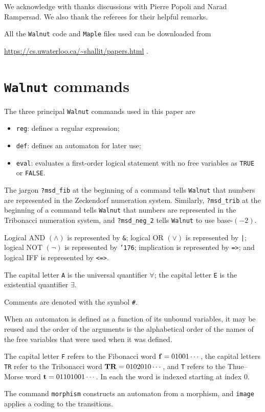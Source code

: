 \documentclass[final]{dmtcs-episciences}
\theoremstyle{plain}
\theoremstyle{remark}
\begin{document}
We acknowledge with thanks discussions with Pierre Popoli and Narad Rampersad.  We also thank the referees for their helpful remarks.

All the {\tt Walnut} code and {\tt Maple} files used can be downloaded from \\
\centerline{\url{https://cs.uwaterloo.ca/~shallit/papers.html} . } 


\nocite{*}

%

\label{sec:biblio}


\appendix
\section{{\tt Walnut} commands}

The three principal {\tt Walnut} commands used in this paper are
\begin{itemize}
    \item {\tt reg}:  defines a regular expression;
    \item {\tt def}: defines an automaton for later use;
    \item {\tt eval}: evaluates a first-order logical statement with no free variables as {\tt TRUE} or {\tt FALSE}.
\end{itemize}

The jargon {\tt ?msd\_fib} at the beginning of a command tells {\tt Walnut} that numbers are represented in the Zeckendorf numeration system.   Similarly, {\tt ?msd\_trib} at the beginning of a command tells {\tt Walnut} that numbers are represented in the Tribonacci numeration system, and
{\tt ?msd\_neg\_2} tells {\tt Walnut} to use base-$(-2)$.

Logical AND $(\wedge)$ is represented by {\tt \&}; logical OR $(\vee)$ is represented by {\tt |}; logical NOT $(\neg)$ is represented by
{\tt \char'176}; implication is represented by {\tt =>}; and logical
IFF is represented by {\tt <=>}.

The capital letter {\tt A} is the universal quantifier $\forall$; the capital letter {\tt E} is the existential quantifier $\exists$.

Comments are denoted with the symbol {\tt \#}.

When an automaton is defined as a function of its unbound variables, it may be reused and the order of the arguments is the alphabetical order of the names of the free variables that were used when it was defined.

The capital letter {\tt F} refers to the Fibonacci word ${\bf f} = 01001\cdots$, the capital letters {\tt TR} 
refer to the Tribonacci word
${\bf TR} = 0102010\cdots$,
and {\tt T} refers to the Thue--Morse word ${\bf t} = 01101001\cdots$.
In each the word is indexed starting at index $0$.

The command {\tt morphism} constructs an automaton from a morphism, and {\tt image} applies a coding to the transitions.
\end{document}

